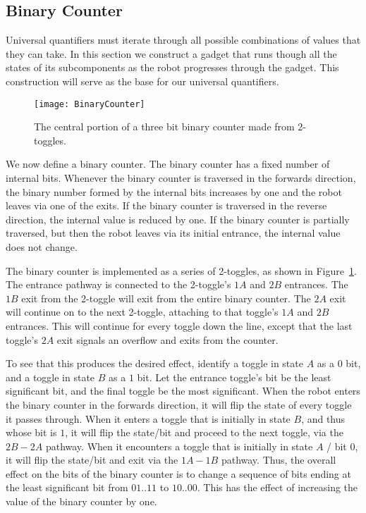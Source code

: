 \subsection{Binary Counter}

Universal quantifiers must iterate through all possible combinations of values that they can take. In this section we construct a gadget that runs though all the states of its subcomponents as the robot progresses through the gadget. This construction will serve as the base for our universal quantifiers.

\begin{figure}[h!]
\centering
    \texttt{[image: BinaryCounter]}
    \caption{The central portion of a three bit binary counter made from 2-toggles.}
    \label{fig:BinaryCounter}
\end{figure}
  
We now define a binary counter. The binary counter has a fixed number of internal bits.
Whenever the binary counter is traversed in the forwards direction, the binary number
formed by the internal bits increases by one and the robot leaves via one of the exits.
If the binary counter is traversed in the reverse direction, the internal value is reduced by
one. If the binary counter is partially traversed, but then the robot leaves via its initial entrance,
the internal value does not change.

The binary counter is implemented as a series of 2-toggles, as shown in Figure~\ref{fig:BinaryCounter}.
The entrance pathway is connected to the 2-toggle's $1A$ and $2B$ entrances. The $1B$ exit from the 2-toggle
will exit from the entire binary counter. The $2A$ exit will continue on to the next 2-toggle,
attaching to that toggle's $1A$ and $2B$ entrances. This will continue for every toggle down the line, except
that the last toggle's $2A$ exit signals an overflow and exits from the counter.

To see that this produces the desired effect, identify a toggle in state $A$ as a $0$ bit, and a toggle in state
$B$ as a $1$ bit. Let the entrance toggle's bit be the least significant bit, and the final toggle be the
most significant. When the robot enters the binary counter in the forwards direction, it will flip
the state of every toggle it passes through. When it enters a toggle that is initially in state $B$, and thus whose
bit is $1$, it will flip the state/bit and proceed to the next toggle, via the $2B - 2A$ pathway. When it
encounters a toggle that is initially in state $A$ / bit $0$, it will flip the state/bit and exit via the $1A - 1B$
pathway. Thus, the overall effect on the bits of the binary counter is to change a sequence of bits ending at the
least significant bit from $01..11$ to $10..00$. This has the effect of increasing the value of the binary counter
by one.

